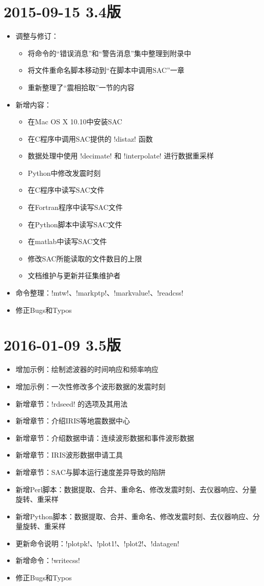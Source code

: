 \section*{2015-09-15 3.4版}
\begin{itemize}
\item 调整与修订：
    \begin{itemize}
    \item 将命令的``错误消息''和``警告消息''集中整理到附录中
    \item 将文件重命名脚本移动到``在脚本中调用SAC''一章
    \item 重新整理了``震相拾取''一节的内容
    \end{itemize}
\item 新增内容：
    \begin{itemize}
    \item 在Mac OS X 10.10中安装SAC
    \item 在C程序中调用SAC提供的 !distaz! 函数
    \item 数据处理中使用 !decimate! 和 !interpolate! 进行数据重采样
    \item Python中修改发震时刻
    \item 在C程序中读写SAC文件
    \item 在Fortran程序中读写SAC文件
    \item 在Python脚本中读写SAC文件
    \item 在matlab中读写SAC文件
    \item 修改SAC所能读取的文件数目的上限
    \item 文档维护与更新并征集维护者
    \end{itemize}
\item 命令整理：!mtw!、!markptp!、!markvalue!、!readcss!
\item 修正Bugs和Typos
\end{itemize}

\section*{2016-01-09 3.5版}
\begin{itemize}
\item 增加示例：绘制滤波器的时间响应和频率响应
\item 增加示例：一次性修改多个波形数据的发震时刻
\item 新增章节：!rdseed! 的选项及其用法
\item 新增章节：介绍IRIS等地震数据中心
\item 新增章节：介绍数据申请：连续波形数据和事件波形数据
\item 新增章节：IRIS波形数据申请工具
\item 新增章节：SAC与脚本运行速度差异导致的陷阱
\item 新增Perl脚本：数据提取、合并、重命名、修改发震时刻、去仪器响应、分量旋转、重采样
\item 新增Python脚本：数据提取、合并、重命名、修改发震时刻、去仪器响应、分量旋转、重采样
\item 更新命令说明：!plotpk!、!plot1!、!plot2!、!datagen!
\item 新增命令：!writecss!
\item 修正Bugs和Typos
\end{itemize}
